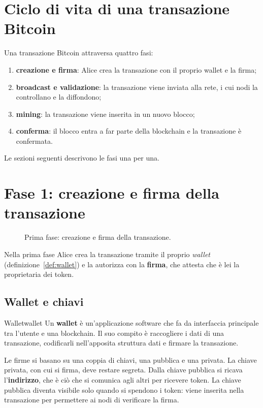 \documentclass[a4paper, 11pt, oneside]{book}
\begin{document}
	\section{Ciclo di vita di una transazione Bitcoin}
	Una transazione Bitcoin attraversa quattro fasi:
	\begin{enumerate}
		\item \textbf{creazione e firma}: Alice crea la transazione con il proprio wallet
			e la firma;
		\item \textbf{broadcast e validazione}: la transazione viene inviata alla rete, i
			cui nodi la controllano e la diffondono;
		\item \textbf{mining}: la transazione viene inserita in un nuovo blocco;
		\item \textbf{conferma}: il blocco entra a far parte della blockchain e la
			transazione è confermata.
	\end{enumerate}
	Le sezioni seguenti descrivono le fasi una per una.

	\section{Fase 1: creazione e firma della transazione}
	\begin{figure}[H]
		\centering
		\caption{Prima fase: creazione e firma della transazione.}
		\label{fig:ciclo-vita-fase1}
	\end{figure}

	Nella prima fase Alice crea la transazione tramite il proprio \textit{wallet}
	(definizione~\ref{def:wallet}) e la autorizza con la \textbf{firma}, che attesta che
	è lei la proprietaria dei token.

	\subsection{Wallet e chiavi}
	\begin{definizione}{Wallet}{wallet}
		Un \textbf{wallet} è un'applicazione software che fa da interfaccia principale tra
		l'utente e una blockchain. Il suo compito è raccogliere i dati di una transazione,
		codificarli nell'apposita struttura dati e firmare la transazione.
	\end{definizione}

	Le firme si basano su una coppia di chiavi, una pubblica e una privata. La chiave
	privata, con cui si firma, deve restare segreta. Dalla chiave pubblica si ricava
	l'\textbf{indirizzo}, che è ciò che si comunica agli altri per ricevere token. La
	chiave pubblica diventa visibile solo quando si spendono i token: viene inserita
	nella transazione per permettere ai nodi di verificare la firma.
\end{document}

